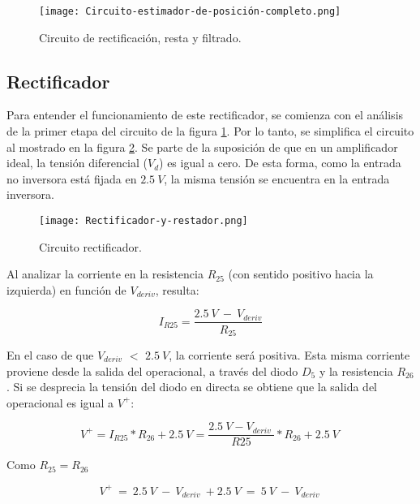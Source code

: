 \begin{figure}[H]
	\centering
	\texttt{[image: Circuito-estimador-de-posición-completo.png]}
	\caption{Circuito de rectificación, resta y filtrado.}
	\label{fig:img_Circuito_estimador_de_posición_completo}
\end{figure}

\subsection{Rectificador}

Para entender el funcionamiento de este rectificador, se comienza con el análisis de la primer etapa del circuito de la figura \ref{fig:img_Circuito_estimador_de_posición_completo}. Por lo tanto, se simplifica el circuito al mostrado en la figura \ref{fig:img_Rectificador_y_restador}. Se parte de la suposición de que en un amplificador ideal, la tensión diferencial ($V_d$) es igual a cero. De esta forma, como la entrada no inversora está fijada en $2.5\:V$, la misma tensión se encuentra en la entrada inversora.


\begin{figure}[H]
	\centering
	\texttt{[image: Rectificador-y-restador.png]}
	\caption{Circuito rectificador.}
	\label{fig:img_Rectificador_y_restador}
\end{figure}

Al analizar la corriente en la resistencia $R_{25}$ (con sentido positivo hacia la izquierda) en función de $V_{deriv}$, resulta:

\begin{equation} \label{eq_corriente_r25}
	I_{R25}=\frac{2.5\:V\ -\ V_{deriv}}{R_{25}}
\end{equation}

En el caso de que $V_{deriv}$ $\mathrm{<}$ $2.5\:V$, la corriente será positiva. Esta misma corriente proviene desde la salida del operacional, a través del diodo $D_5$ y la resistencia $R_{26}$. Si se desprecia la tensión del diodo en directa se obtiene que la salida del operacional es igual a $V^+$:

\begin{equation} \label{eq_V+}
	V^+=I_{R25}*R_{26}+2.5\:V=\frac{2.5\:V-V_{deriv}\ }{R25}*R_{26}+2.5\:V\ 
\end{equation} 

Como $R_{25}=R_{26}$

\begin{equation} \label{eq_V+_2}
	V^+\ =\ 2.5\:V\ -\ V_{deriv}\ +2.5\:V\ =\ 5\:V\ -\ V_{deriv}\ 
\end{equation}

